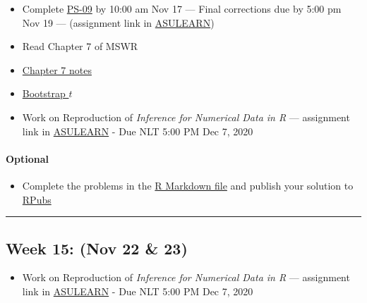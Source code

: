 \documentclass[
]{article}
\providecommand{\tightlist}{%
  \setlength{\itemsep}{0pt}\setlength{\parskip}{0pt}}
\begin{document}
\begin{itemize}
\item
  Complete
  \href{https://classroom.github.com/classrooms/87543903-stt3850-fall2021}{PS-09}
  by 10:00 am Nov 17 --- Final corrections due by 5:00 pm Nov 19 ---
  (assignment link in
  \href{https://asulearn.appstate.edu/course/view.php?id=131169}{ASULEARN})
\item
  Read Chapter 7 of MSWR
\item
  \href{../Notes/Children/ConfidenceIntervals2.html}{Chapter 7 notes}
\item
  \href{../Rmarkdown/MoreBootstrapping.html}{Bootstrap \(t\)}
\item
  Work on Reproduction of \emph{Inference for Numerical Data in R} ---
  assignment link in
  \href{https://asulearn.appstate.edu/course/view.php?id=131169}{ASULEARN}
  - Due NLT 5:00 PM Dec 7, 2020
\end{itemize}

\begin{rmdoptional}
\hypertarget{optional}{%
\paragraph*{Optional}\label{optional}}

\begin{itemize}
\tightlist
\item
  Complete the problems in the
  \href{https://raw.githubusercontent.com/alanarnholt/STT3850/gh-pages/Homework/Chapter7HWK.Rmd}{R
  Markdown file} and publish your solution to
  \href{http://rpubs.com/}{RPubs}
\end{itemize}
\end{rmdoptional}

\begin{center}\rule{0.5\linewidth}{0.5pt}\end{center}

\hypertarget{week-15-nov-22-23}{%
\subsection*{Week 15: (Nov 22 \& 23)}\label{week-15-nov-22-23}}

\begin{itemize}
\tightlist
\item
  Work on Reproduction of \emph{Inference for Numerical Data in R} ---
  assignment link in
  \href{https://asulearn.appstate.edu/course/view.php?id=131169}{ASULEARN}
  - Due NLT 5:00 PM Dec 7, 2020
\end{itemize}
\end{document}
